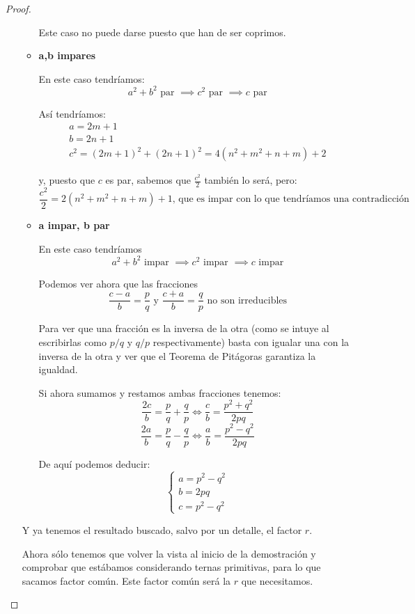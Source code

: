 \documentclass{apuntes}
\begin{document}
\begin{proof}
\begin{enumerate}
\begin{itemize}
Este caso no puede darse puesto que han de ser coprimos.

\item \textbf{a,b impares}

En este caso tendríamos:
\[a^2+b^2 \text{ par } \implies c^2 \text{ par } \implies c \text{ par}\]

Así tendríamos:
\[\begin{array}{l} a=2m+1 \\ b = 2n+1 \\ c^2 =(2m+1)^2+(2n+1)^2 = 4(n^2+m^2+n+m)+2\end{array} \]

y, puesto que $c$ es par, sabemos que $\frac{c^2}{2}$ también lo será, pero:
\[\frac{c^2}{2} = 2(n^2+m^2+n+m)+1 \text{, que es impar con lo que tendríamos una contradicción}\]

\item \textbf{a impar, b par}

En este caso tendríamos
\[a^2+b^2 \text{ impar } \implies c^2 \text{ impar } \implies c \text{ impar}\]

Podemos ver ahora que las fracciones
\[\frac{c-a}{b}=\frac{p}{q} \text{ y } \frac{c+a}{b}=\frac{q}{p} \text{ no son irreducibles}\]

\obs Para ver que una fracción es la inversa de la otra (como se intuye al escribirlas como $p/q$ y $q/p$ respectivamente) basta con igualar una con la inversa de la otra y ver que el Teorema de Pitágoras garantiza la igualdad.

Si ahora sumamos y restamos ambas fracciones tenemos:
\[\frac{2c}{b}=\frac{p}{q}+\frac{q}{p} \iff \frac{c}{b}=\frac{p^2+q^2}{2pq}\]
\[\frac{2a}{b}=\frac{p}{q}-\frac{q}{p} \iff \frac{a}{b}=\frac{p^2-q^2}{2pq}\]

De aquí podemos deducir:
\[\left\{ \begin{array}{l} a=p^2-q^2 \\ b=2pq \\ c=p^2-q^2 \end{array} \right.\]

\end{itemize}
Y ya tenemos el resultado buscado, salvo por un detalle, el factor $r$.

Ahora sólo tenemos que volver la vista al inicio de la demostración y comprobar que estábamos considerando ternas primitivas, para lo que sacamos factor común. Este factor común será la $r$ que necesitamos.
\end{enumerate}
\end{proof}
\end{document}
